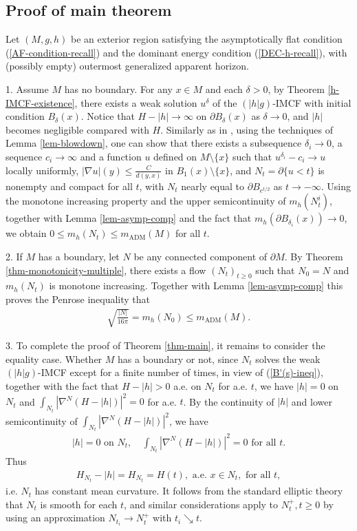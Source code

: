 \documentclass[11pt, letterpaper]{amsart}
\theoremstyle{definition}
\theoremstyle{remark}
\begin{document}
\subsection{Proof of main theorem}
Let $(M, g, h)$ be an exterior region satisfying the asymptotically flat condition (\ref{AF-condition-recall}) and the dominant energy condition (\ref{DEC-h-recall}), with (possibly empty) outermost generalized apparent horizon.

1. Assume $M$ has no boundary. For any $x \in M$ and each $\delta >0$, by Theorem \ref{h-IMCF-existence}, there exists a weak solution $u ^{\delta }$ of the $(|h|g)$-IMCF with initial condition $B_{\delta }(x)$. Notice that $H- |h| \to \infty$ on $\partial B_{\delta }(x)$ as $\delta \to 0$, and $|h|$ becomes negligible compared with $H$. Similarly as in \cite[Lemma 8.1]{HI01}, using the techniques of Lemma \ref{lem-blowdown}, one can show that there exists a subsequence $\delta _i \to 0$, a sequence $c_i \to \infty$ and a function $u$ defined on $M \setminus \{x\} $ such that $u ^{\delta _i} - c_i \to u$ locally uniformly, $|\nabla u|(y) \leq \frac{C}{d(y,x)}$ in $B_1(x) \setminus \{x\} $, and $N_t = \partial \{ u< t\} $ is nonempty and compact for all $t$, with $N_{t}$ nearly equal to $\partial B_{e ^{t / 2}}$ as $t \to - \infty$. Using the monotone increasing property and the upper semicontinuity of $m_{h}(N ^{i}_{t})$, together with Lemma \ref{lem-asymp-comp} and the fact that $m_{h}(\partial B_{\delta _i}(x) ) \to 0$, we obtain $0 \leq m_{h}(N_t) \leq m_{\mathrm{ADM}}(M)$ for all $t$.

2. If $M$ has a boundary, let $N$ be any connected component of $\partial M$. By Theorem \ref{thm-monotonicity-multiple}, there exists a flow $(N_{t})_{t \geq 0}$ such that $N_0=N$ and $m_{h}(N_t)$ is monotone increasing. Together with Lemma \ref{lem-asymp-comp} this proves the Penrose inequality that 
\begin{align*}
	\sqrt{\frac{|N|}{16 \pi }} = m_{h}(N_0) \leq m_{\mathrm{ADM}}(M).
\end{align*} 

3. To complete the proof of Theorem \ref{thm-main}, it remains to consider the equality case. Whether $M$ has a boundary or not, since $N_t$ solves the weak $(|h|g)$-IMCF except for a finite number of times, in view of (\ref{B'(s)-ineq}), together with the fact that $H-|h|>0$ a.e. on $N_t$ for a.e. $t$, we have $|h| = 0$ on $N_t$ and $\int_{N_t} |\nabla ^{N}(H- |h|)|^2 =0$ for a.e. $t$. By the continuity of $|h|$ and lower semicontinuity of $\int_{N_t} |\nabla ^{N}(H- |h|)|^2$, we have
\begin{align*}
	|h| = 0 \text{ on } N_t,\quad \int_{N_t}|\nabla ^{N}(H- |h|)|^2 =0 \text{ for all } t.
\end{align*}
Thus 
\begin{align*}
	H_{N_t} - |h| = H_{N_t} = H(t), \text{ a.e. } x \in N_{t}, \text{ for all } t,
\end{align*} 
i.e. $N_{t}$ has constant mean curvature. It follows from the standard elliptic theory that $N_{t}$ is smooth for each $t$, and similar considerations apply to $N_{t} ^{+}, t \geq 0$ by using an approximation $N_{t_i} \to N_{t}^{+}$ with $t_i \searrow t$.
\end{document}
